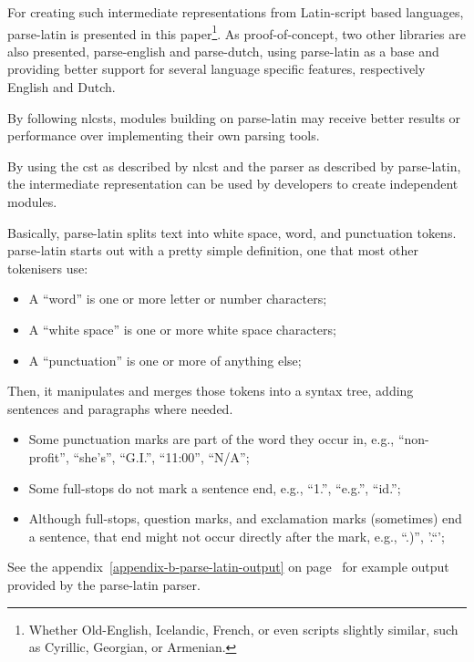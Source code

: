 For creating such intermediate representations from Latin-script based
languages, parse-latin is presented in this paper\footnote{Whether
  Old-English, Icelandic, French, or even scripts slightly similar, such
  as Cyrillic, Georgian, or Armenian.}. As proof-of-concept, two other
libraries are also presented, parse-english and parse-dutch, using
parse-latin as a base and providing better support for several language
specific features, respectively English and Dutch.

By following \glspl{nlcst}, modules building on parse-latin may receive
better results or performance over implementing their own parsing tools.

By using the \gls{cst} as described by \gls{nlcst} and the parser as
described by parse-latin, the intermediate representation can be used by
developers to create independent modules.

Basically, parse-latin splits text into white space, word, and
punctuation tokens. parse-latin starts out with a pretty simple
definition, one that most other tokenisers use:

\begin{itemize}
\itemsep1pt\parskip0pt
\item
  A ``word'' is one or more letter or number characters;
\item
  A ``white space'' is one or more white space characters;
\item
  A ``punctuation'' is one or more of anything else;
\end{itemize}

Then, it manipulates and merges those tokens into a syntax tree, adding
sentences and paragraphs where needed.

\begin{itemize}
\itemsep1pt\parskip0pt
\item
  Some punctuation marks are part of the word they occur in, e.g.,
  ``non-profit'', ``she's'', ``G.I.'', ``11:00'', ``N\slash A'';
\item
  Some full-stops do not mark a sentence end, e.g., ``1.'', ``e.g.'',
  ``id.'';
\item
  Although full-stops, question marks, and exclamation marks (sometimes)
  end a sentence, that end might not occur directly after the mark,
  e.g., ``.)'', '.``';
\end{itemize}

See the appendix~\ref{appendix-b-parse-latin-output} on
page~\pageref{appendix-b-parse-latin-output} for example output provided
by the parse-latin parser.

